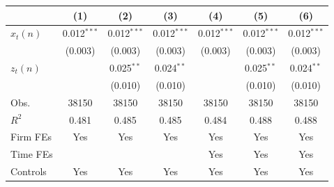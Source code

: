 
\begin{tabular}{l*{6}{c}}
    \toprule
    & (1) & (2) & (3) & (4) & (5) & (6)  \\
    \midrule
    $x_t(n)$ & 0.012$^{***}$ & 0.012$^{***}$ & 0.012$^{***}$ & 0.012$^{***}$ & 0.012$^{***}$ & 0.012$^{***}$ \\
          & (0.003) & (0.003) & (0.003) & (0.003) & (0.003) & (0.003) \\
    $z_t(n)$ &  & 0.025$^{**}$ & 0.024$^{**}$ &  & 0.025$^{**}$ & 0.024$^{**}$ \\
          &  & (0.010) & (0.010) &  & (0.010) & (0.010) \\
    \midrule
    Obs.     & 38150 & 38150 & 38150 & 38150 & 38150 & 38150 \\
    $R^2$  & 0.481 & 0.485 & 0.485 & 0.484 & 0.488 & 0.488 \\
    Firm FEs & Yes & Yes & Yes & Yes & Yes & Yes  \\
    Time FEs &  &  &  & Yes & Yes & Yes \\
    Controls & Yes & Yes & Yes & Yes & Yes & Yes \\
    \bottomrule
\end{tabular}
